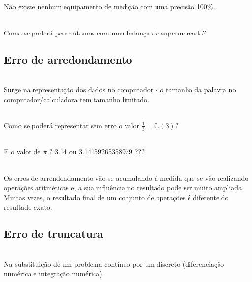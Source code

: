 \documentclass[12pt, a4paper, titlepage, oneside, dvipsnames]{report}
\begin{document}
        \begin{paragraph}\\
        Não existe nenhum equipamento de medição com uma precisão 100\%.
        \end{paragraph}

        \begin{paragraph}\\
        Como se poderá pesar átomos com uma balança de supermercado?
        \end{paragraph}

    \subsection{\color{RoyalPurple} Erro de arredondamento}

        \begin{paragraph}\\
        Surge na representação dos dados no computador - o tamanho da palavra no computador/calculadora tem {\color{Mahogany} tamanho limitado}.
        \end{paragraph}


        \begin{paragraph}\\
        Como se poderá representar sem erro o valor {\color{RoyalPurple} \(\frac{1}{3} = 0.(3)\)}?
        \end{paragraph}

        \begin{paragraph}\\
        E o valor de {\color{RoyalPurple} $\pi$} ? {\color{RoyalPurple} 3.14} ou {\color{RoyalPurple} 3.14159265358979} ???
        \end{paragraph}

        \begin{paragraph}\\
        Os erros de arrendondamento vão-se acumulando à medida que se vão realizando operações aritméticas e, a sua influência 
        no resultado pode ser muito ampliada. Muitas vezes, o resultado final de um conjunto de operações é diferente do resultado
        exato.
        \end{paragraph}

    \subsection{\color{RoyalPurple} Erro de truncatura}

        \begin{paragraph}\\
        Na substituição de um problema contínuo por um {\color{Mahogany} discreto} (diferenciação numérica e integração numérica).
        \end{paragraph}
\end{document}
